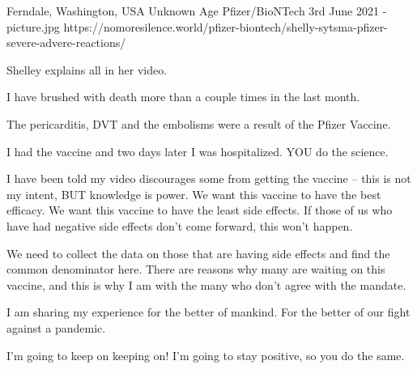 \testimony{ }
{Ferndale, Washington, USA}
{Unknown Age}
{Pfizer/BioNTech}
{3rd June 2021}
{-}
{picture.jpg}
{https://nomoresilence.world/pfizer-biontech/shelly-sytsma-pfizer-severe-advere-reactions/}
{


Shelley explains all in her video.

I have brushed with death more than a couple times in the last month.

The pericarditis, DVT and the embolisms were a result of the Pfizer Vaccine.

I had the vaccine and two days later I was hospitalized. YOU do the science.

I have been told my video discourages some from getting the vaccine – this is not my intent, BUT knowledge is power. We want this vaccine to have the best efficacy. We want this vaccine to have the least side effects. If those of us who have had negative side effects don’t come forward, this won’t happen.

We need to collect the data on those that are having side effects and find the common denominator here. There are reasons why many are waiting on this vaccine, and this is why I am with the many who don’t agree with the mandate.

I am sharing my experience for the better of mankind. For the better of our fight against a pandemic.

I’m going to keep on keeping on! I’m going to stay positive, so you do the same.
}
